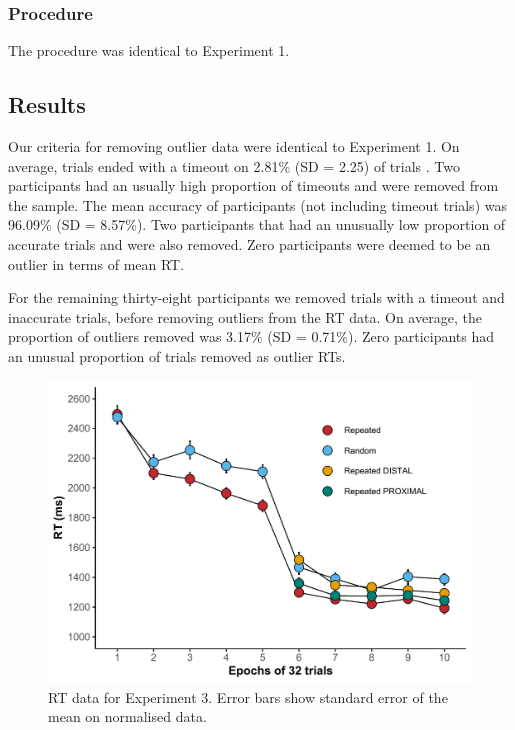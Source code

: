 \documentclass[
  man,floatsintext]{apa7}
\begin{document}
\hypertarget{procedure-2}{%
\subsubsection{Procedure}\label{procedure-2}}

The procedure was identical to Experiment 1.

\hypertarget{results-2}{%
\subsection{Results}\label{results-2}}

Our criteria for removing outlier data were identical to Experiment 1. On average, trials ended with a timeout on 2.81\% (SD = 2.25) of trials . Two participants had an usually high proportion of timeouts and were removed from the sample. The mean accuracy of participants (not including timeout trials) was 96.09\% (SD = 8.57\%). Two participants that had an unusually low proportion of accurate trials and were also removed. Zero participants were deemed to be an outlier in terms of mean RT.

For the remaining thirty-eight participants we removed trials with a timeout and inaccurate trials, before removing outliers from the RT data. On average, the proportion of outliers removed was 3.17\% (SD = 0.71\%). Zero participants had an unusual proportion of trials removed as outlier RTs.

\begin{figure}

{\centering \includegraphics{CCC_ms1_files/figure-latex/Exp3-RT-figure-1} 

}

\caption{RT data for Experiment 3. Error bars show standard error of the mean on normalised data.}\label{fig:Exp3-RT-figure}
\end{figure}
\end{document}
